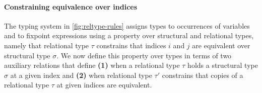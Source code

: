 \paragraph{Constraining equivalence over indices}
%
The typing system in \autoref{fig:reltype-rules} assigns types to
occurrences of variables and to fixpoint expressions using a property
over structural and relational types, namely that relational type
$\tau$ constrains that indices $i$ and $j$ are equivalent over
structural type $\sigma$.
%
We now define this property over types in terms of two auxiliary
relations that define \textbf{(1)} when a relational type $\tau$ holds
a structural type $\sigma$ at a given index and \textbf{(2)} when
relational type $\tau'$ constrains that copies of a relational type
$\tau$ at given indices are equivalent.

